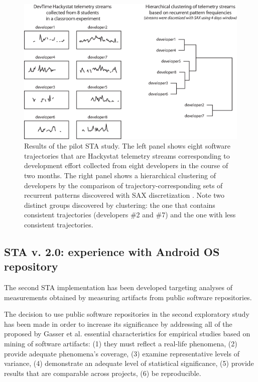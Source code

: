 \begin{figure}[t]
   \centering
   \includegraphics[width=145mm]{figures/STA1.eps}
   \caption{Results of the pilot STA study. 
   The left panel shows eight software trajectories that are Hackystat telemetry streams 
   corresponding to development effort \cite{citeulike:557296} collected from eight developers in the course of two months.
   The right panel shows a hierarchical clustering of developers by the comparison of trajectory-corresponding sets of 
   recurrent patterns discovered with SAX discretization \cite{sax}. 
   Note two distinct groups discovered by clustering: the one that contains consistent trajectories (developers \#2 and \#7) 
   and the one with less consistent trajectories.}
   \label{fig:STA1-results}
\end{figure}


\subsection{STA v. 2.0: experience with Android OS repository}
The second STA implementation has been developed targeting analyses of measurements obtained by measuring artifacts 
from public software repositories.

The decision to use public software repositories in the second exploratory study has been made in order to increase its 
significance by addressing all of the proposed by Gasser et al. \cite{citeulike:13058334} essential characteristics for 
empirical studies based on mining of software artifacts:  
(1) they must reflect a real-life phenomena, 
(2) provide adequate phenomena's coverage, 
(3) examine representative levels of variance, 
(4) demonstrate an adequate level of statistical significance,
(5) provide results that are comparable across projects,
(6) be reproducible. 

